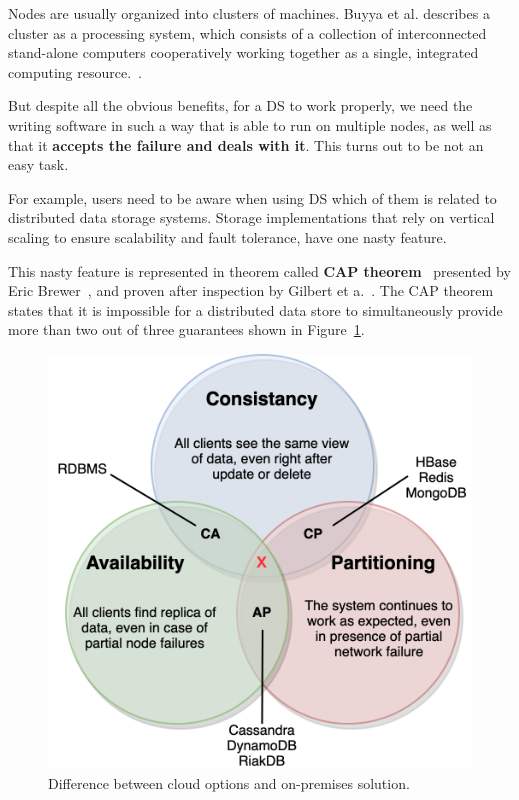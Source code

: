 \noindent
Nodes are usually organized into clusters of machines. Buyya et al. describes a cluster as a processing system, which consists of a collection of interconnected stand-alone computers cooperatively working together as a single, integrated computing resource.~\cite{Buyya}.

But despite all the obvious benefits, for a DS to work properly, we need the writing software in such a way that is able to run on multiple nodes, as well as that it \textbf{accepts the failure and deals with it}. This turns out to be not an easy task.

For example, users need to be aware when using DS which of them is related to distributed data storage systems. Storage implementations that rely on vertical scaling to ensure scalability and fault tolerance, have one nasty feature. 

This nasty feature is represented in theorem called \textbf{CAP theorem}~\label{lab:cap} presented by Eric Brewer~\cite{Brewer2000}, and proven after inspection by Gilbert et a.~\cite{GilbertL02}. The CAP theorem states that it is impossible for a distributed data store to simultaneously provide more than two out of three guarantees shown in Figure~\ref{fig:fig17}.

\begin{figure}[H]
	\begin{center}
		\includegraphics[scale=0.85]{images/Figure17}
	\end{center}
	\vspace{-0.6cm}
	\caption{Difference between cloud options and on-premises solution.}
	\label{fig:fig17}
\end{figure}

